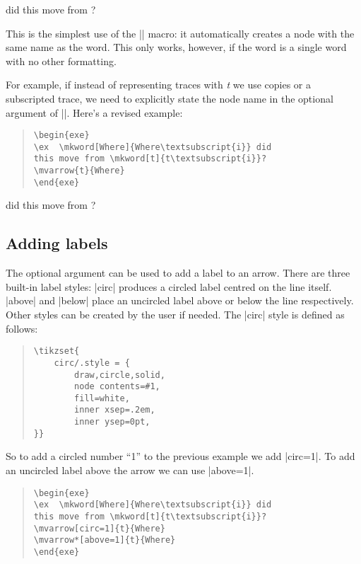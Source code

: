 \documentclass[11pt]{article}
\begin{document}
\begin{exe}
\ex  {} did this move from ?
\label{where}
\end{exe}

This is the simplest use of the |\mkword| macro: it automatically creates a node with the same name as the word.  This only works, however, if the word is a single word with no other formatting. 

For example, if instead of representing traces with \emph{t} we use copies or a subscripted trace, we need to explicitly state the node name in the optional argument of |\mkword|.  Here’s a revised example:
\begin{quote}
\begin{lstlisting}
\begin{exe}
\ex  \mkword[Where]{Where\textsubscript{i}} did 
this move from \mkword[t]{t\textsubscript{i}}?
\mvarrow{t}{Where}
\end{exe}
\end{lstlisting}
\end{quote}

\begin{exe}
\ex  {} did this move from ?
\label{where2}
\end{exe}
\subsection{Adding labels}
The optional argument can be used to add a label to an arrow.  There are three built-in label styles:  |circ| produces a circled label centred on the line itself. |above| and |below| place an uncircled label above or below the line respectively. Other styles can be created by the user if needed.  The |circ| style is defined as follows:

\begin{quote}
\begin{lstlisting}
\tikzset{
	circ/.style = {
  		draw,circle,solid,
  		node contents=#1,
  		fill=white,
  		inner xsep=.2em,
  		inner ysep=0pt,
}}
\end{lstlisting}
\end{quote}

So to add a circled number “1” to the previous example we add |circ=1|. To add an uncircled label above the arrow we can use |above=1|.

\begin{quote}
\begin{lstlisting}
\begin{exe}
\ex  \mkword[Where]{Where\textsubscript{i}} did 
this move from \mkword[t]{t\textsubscript{i}}?
\mvarrow[circ=1]{t}{Where}
\mvarrow*[above=1]{t}{Where}
\end{exe}
\end{lstlisting}
\end{quote}
\end{document}
